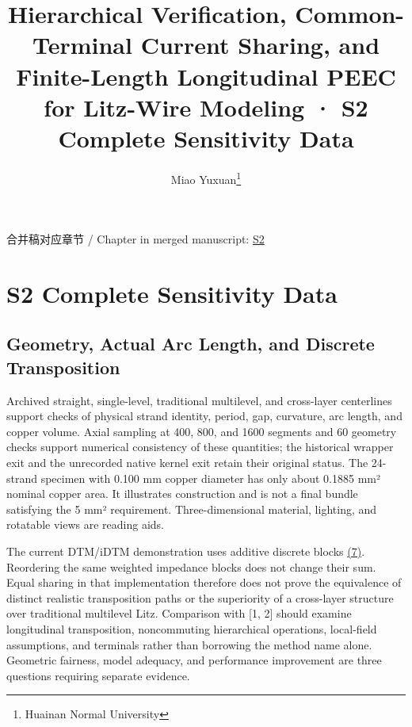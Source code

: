 \documentclass[journal,10pt]{IEEEtran}
\begin{document}
\title{Hierarchical Verification, Common-Terminal Current Sharing, and Finite-Length Longitudinal PEEC for Litz-Wire Modeling · S2 Complete Sensitivity Data}
\author{Miao Yuxuan\thanks{Huainan Normal University}}

\maketitle
\noindent 合并稿对应章节 / Chapter in merged manuscript: \href{paper_en_ieee.pdf#chapter-S2}{S2}\par
\FloatBarrier
\section*{S2 Complete Sensitivity Data}
\hypertarget{chapter-S2}{}
\subsection*{Geometry, Actual Arc Length, and Discrete Transposition}
\hypertarget{S2.geometry.heading}{}
Archived straight, single-level, traditional multilevel, and cross-layer centerlines support checks of physical strand identity, period, gap, curvature, arc length, and copper volume. Axial sampling at 400, 800, and 1600 segments and 60 geometry checks support numerical consistency of these quantities; the historical wrapper exit and the unrecorded native kernel exit retain their original status. The 24-strand specimen with 0.100 mm copper diameter has only about 0.1885 mm² nominal copper area. It illustrates construction and is not a final bundle satisfying the 5 mm² requirement. Three-dimensional material, lighting, and rotatable views are reading aids.


The current DTM/iDTM demonstration uses additive discrete blocks \href{paper_en_ieee.pdf#E06}{(7)}. Reordering the same weighted impedance blocks does not change their sum. Equal sharing in that implementation therefore does not prove the equivalence of distinct realistic transposition paths or the superiority of a cross-layer structure over traditional multilevel Litz. Comparison with [1, 2] should examine longitudinal transposition, noncommuting hierarchical operations, local-field assumptions, and terminals rather than borrowing the method name alone. Geometric fairness, model adequacy, and performance improvement are three questions requiring separate evidence.
\end{document}
